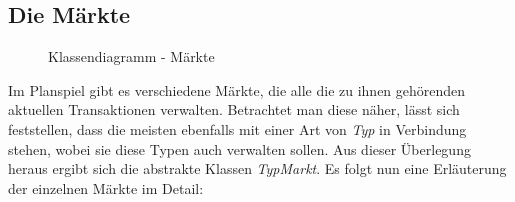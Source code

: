 \subsection{Die Märkte}
\begin{figure}[htb]
     \centering
     \caption{Klassendiagramm - Märkte}
     \label{img:fachkonzept-entwurf-markt}
\end{figure}

Im Planspiel gibt es verschiedene Märkte, die alle die zu ihnen gehörenden aktuellen Transaktionen verwalten. Betrachtet man diese näher, lässt sich feststellen, dass die meisten ebenfalls mit einer Art von \textit{Typ} in Verbindung stehen, wobei sie diese Typen auch verwalten sollen. Aus dieser Überlegung heraus ergibt sich die abstrakte Klassen \textit{TypMarkt}. Es folgt nun eine Erläuterung der einzelnen Märkte im Detail:

